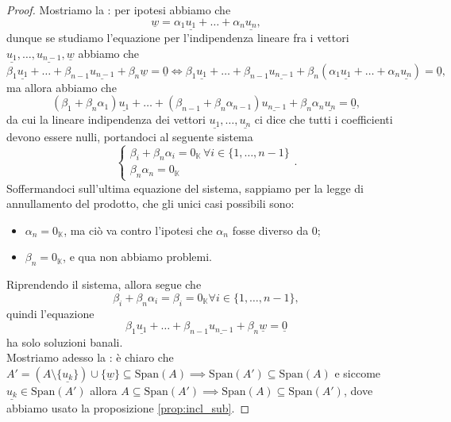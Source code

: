 \begin{proof}
    Mostriamo la : per ipotesi abbiamo che
    $$
        \underline{w} = \alpha_1 \underline{u_1} + \ldots + \alpha_n \underline{u_n},
    $$
    dunque se studiamo l'equazione per l'indipendenza lineare fra i vettori $\underline{u_1}, \ldots, \underline{u_{n-1}}, \underline{w}$ abbiamo che
    $$
        \beta_1 \underline{u_1} + \ldots + \beta_{n-1} \underline{u_{n-1}} + \beta_n \underline{w} = \underline{0} \iff \beta_1 \underline{u_1} + \ldots + \beta_{n-1} \underline{u_{n-1}} + \beta_n (\alpha_1 \underline{u_1} + \ldots + \alpha_n \underline{u_n}) = \underline{0},
    $$
    ma allora abbiamo che
    $$
        (\beta_1 + \beta_n \alpha_1) \underline{u_1} + \ldots + (\beta_{n-1} + \beta_n \alpha_{n-1})\underline{u_{n-1}} + \beta_n \alpha_n \underline{u_n} = \underline{0},
    $$
    da cui la lineare indipendenza dei vettori $\underline{u_1}, \ldots, \underline{u_n}$ ci dice che tutti i coefficienti devono essere nulli, portandoci al seguente sistema
    $$
        \begin{cases}
            \beta_i + \beta_n \alpha_i = 0_\mathbb{K} \, \forall i \in \{1, \ldots, n-1 \} \\
            \beta_n \alpha_n = 0_\mathbb{K}
        \end{cases}.
    $$
    Soffermandoci sull'ultima equazione del sistema, sappiamo per la legge di annullamento del prodotto, che gli unici casi possibili sono:
    \begin{itemize}
        \item $\boxed{\alpha_n = 0_\mathbb{K}}$, ma ciò va contro l'ipotesi che $\alpha_n$ fosse diverso da $0$;
        \item $\boxed{\beta_n = 0_\mathbb{K}}$, e qua non abbiamo problemi.
    \end{itemize}
    Riprendendo il sistema, allora segue che
    $$
        \beta_i + \beta_n \alpha_i = \beta_i = 0_\mathbb{K} \forall i \in \{ 1, \ldots, n-1 \},
    $$
    quindi l'equazione
    $$
        \beta_1 \underline{u_1} + \ldots + \beta_{n-1} \underline{u_{n-1}} + \beta_n \underline{w} = \underline{0}
    $$
    ha solo soluzioni banali. \\
    Mostriamo adesso la : è chiaro che $A' = (A \setminus \{ \underline{u_k} \}) \cup \{ \underline{w} \} \subseteq \text{Span}(A) \implies \text{Span}(A') \subseteq \text{Span}(A)$ e siccome $\underline{u_k} \in \text{Span}(A')$ allora $A \subseteq \text{Span}(A') \implies \text{Span}(A) \subseteq \text{Span}(A')$, dove abbiamo usato la proposizione \ref{prop:incl_sub}.
\end{proof}
